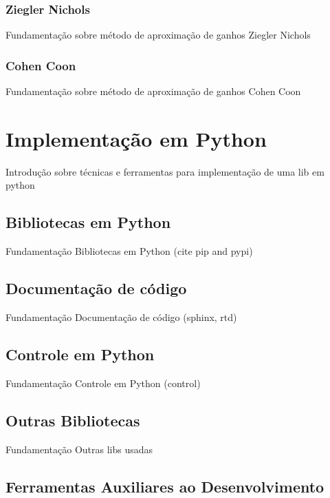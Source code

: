 \subsubsection{Ziegler Nichols}

Fundamentação sobre método de aproximação de ganhos Ziegler Nichols

\subsubsection{Cohen Coon}

Fundamentação sobre método de aproximação de ganhos Cohen Coon

\section{Implementação em Python}

Introdução sobre técnicas e ferramentas para implementação de uma lib em python

\subsection{Bibliotecas em Python}

Fundamentação Bibliotecas em Python (cite pip and pypi)

\subsection{Documentação de código}

Fundamentação Documentação de código (sphinx, rtd)

\subsection{Controle em Python}

Fundamentação Controle em Python (control)

\subsection{Outras Bibliotecas}

Fundamentação Outras libs usadas

\subsection{Ferramentas Auxiliares ao Desenvolvimento}


